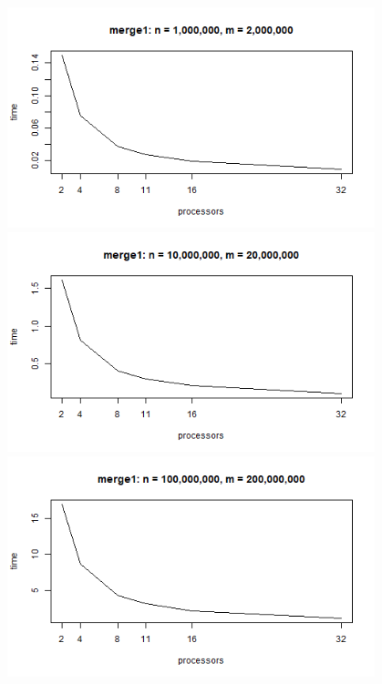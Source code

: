 \documentclass[a4paper,%
11pt,%
DIV=12,
headsepline,%
headings=normal,
]{scrartcl}
\newcommand\plotwidth{0.8\textwidth}
\newcommand\plotheight{0.48\textwidth}
\begin{document}
\includegraphics[width=\plotwidth, height=\plotheight]{plot_merge1_run1_1000000_2000000.png}\\
\includegraphics[width=\plotwidth, height=\plotheight]{plot_merge1_run1_10000000_20000000.png}\\
\includegraphics[width=\plotwidth, height=\plotheight]{plot_merge1_run1_100000000_200000000.png}\\
\end{document}
